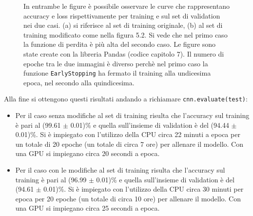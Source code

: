 \begin{figure}[H]
\begin{subfigure}{0.5\textwidth}
      \caption{}
      \label{fig:snap2}
    \end{subfigure}%
    \caption{In entrambe le figure è possibile osservare le curve che rappresentano accuracy e 
    loss rispettivamente per training e sul set di validation nei due casi. (a) si riferisce al set 
    di training originale, (b) al set di training modificato come nella figura 5.2. Si vede che nel primo 
    caso la funzione di perdita è più alta del secondo caso. Le figure sono state create con la 
    libreria Pandas (codice capitolo 7). Il numero di epoche tra le due immagini è diverso perchè
     nel primo caso la funzione \lstinline{EarlyStopping} ha fermato il training alla undicesima epoca, nel secondo alla quindicesima.}
    \label{fig:fig}
\end{figure} 
Alla fine si ottengono questi risultati andando a richiamare \lstinline{cnn.evaluate(test)}:
\begin{itemize}
  \item Per il caso senza modifiche al set di training risulta 
  che l'accuracy sul training è pari al (99.61 $\pm$ 0.01)\% e quella
   sull'insieme di validation è del (94.44 $\pm$ 0.01)\%. Si è impiegato con l'utilizzo della CPU 
   circa 22 minuti a epoca per un totale di 20 epoche (un totale di circa 7 ore)
    per allenare il modello. Con una GPU si impiegano circa 20 secondi a epoca.
  \item  Per il caso con le modifiche al set di training risulta 
  che l'accuracy sul training è pari al (96.99 $\pm$ 0.01)\% e quella 
  sull'insieme di validation è del (94.61 $\pm$ 0.01)\%. Si è impiegato con l'utilizzo della CPU 
   circa 30 minuti per epoca per 20 epoche (un totale di circa 10 ore) per 
   allenare il modello. Con una GPU si impiegano circa 25 secondi a epoca.
  
\end{itemize}


